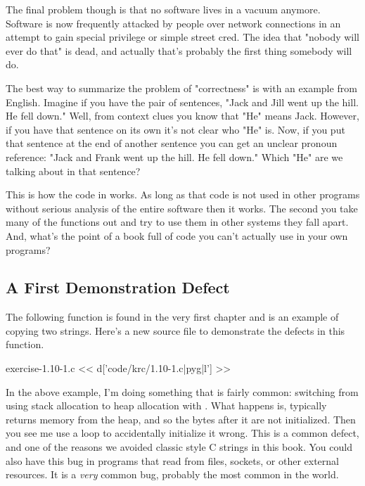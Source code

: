 The final problem though is that no software lives in a vacuum anymore. Software
is now frequently attacked by people over network connections in an attempt to
gain special privilege or simple street cred.  The idea that "nobody will ever do
that" is dead, and actually that's probably the first thing somebody will do.

The best way to summarize the problem of \krc "correctness" is with an example
from English.  Imagine if you have the pair of sentences, "Jack and Jill went up the hill.
He fell down."  Well, from context clues you know that "He" means Jack.  However,
if you have that sentence on its own it's not clear who "He" is.  Now, if you put
that sentence at the end of another sentence you can get an unclear
pronoun reference: "Jack and Frank went up the hill. He fell down."  Which "He"
are we talking about in that sentence?

This is how the code in \krc works.  As long as that code is not used in other
programs without serious analysis of the entire software then it works.  The second
you take many of the functions out and try to use them in other systems they
fall apart.  And, what's the point of a book full of code you can't actually
use in your own programs?


\subsection{A First Demonstration Defect}

The following  function is found in the very first chapter and is
an example of copying two strings.  Here's a new source file to demonstrate the
defects in this function.

\begin{code}{exercise-1.10-1.c}
<< d['code/krc/1.10-1.c|pyg|l'] >>
\end{code}

In the above example, I'm doing something that is fairly common: switching from
using stack allocation to heap allocation with .  What happens
is, typically  returns memory from the heap, and so the bytes
after it are not initialized.  Then you see me use a loop to accidentally
initialize it wrong.  This is a common defect, and one of the reasons we
avoided classic style C strings in this book.  You could also have this bug in
programs that read from files, sockets, or other external resources.  It is a
\emph{very} common bug, probably the most common in the world.

